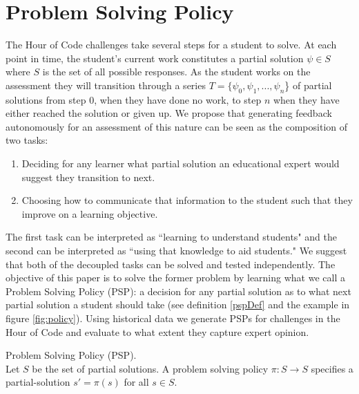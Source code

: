 \section{Problem Solving Policy}

The Hour of Code challenges take several steps for a student to solve. At each point in time, the student's current work constitutes a partial solution $\psi \in S$ where $S$ is the set of all possible responses. As the student works on the assessment they will transition through a series $T = \{\psi_0, \psi_1, ... , \psi_n$\} of partial solutions from step $0$, when they have done no work, to step $n$ when they have either reached the solution or given up. 
We propose that generating feedback autonomously for an assessment of this nature can be seen as the composition of two tasks: 
\begin{enumerate}
\item Deciding for any learner what partial solution an educational expert would suggest they transition to next. 
\item Choosing how to communicate that information to the student such that they improve on a learning objective. 
\end{enumerate}
The first task can be interpreted as ``learning to understand students" and the second can be interpreted as ``using that knowledge to aid students." We suggest that both of the decoupled tasks can be solved and tested independently. The objective of this paper is to solve the former problem by learning what we call a Problem Solving Policy (PSP): a decision for any partial solution as to what next partial solution a student should take (see definition \ref{pspDef} and the example in figure \ref{fig:policy}). Using historical data we generate PSPs for challenges in the Hour of Code and evaluate to what extent they capture expert opinion.

\begin{defo}
Problem Solving Policy (PSP). \\ 
Let $S$ be the set of partial solutions.
A problem solving policy $\pi : S \rightarrow S$ specifies a partial-solution $s' = \pi(s)$ for all $s \in S$.
\label{pspDef}
\end{defo}

